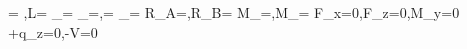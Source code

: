 \sigma = ,\qquad \Delta L=
\sigma_{\max}=
\tau_{\max}=,\qquad \varphi=
\sigma_{}=
R_A=,\quad R_B=
M_{}=,\quad M_{}=
\sum F_x=0,\quad\sum F_z=0,\quad\sum M_y=0
+q_z=0,\qquad{}-V=0
